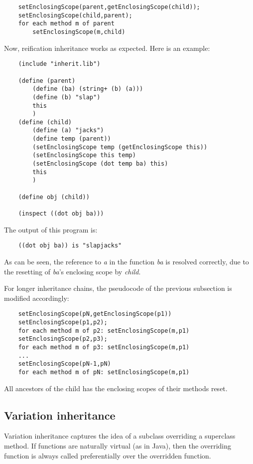 \begin{verbatim}
    setEnclosingScope(parent,getEnclosingScope(child));
    setEnclosingScope(child,parent);
    for each method m of parent
        setEnclosingScope(m,child)
\end{verbatim}

Now, reification inheritance works as expected. Here is an example:

\begin{verbatim}
    (include "inherit.lib")

    (define (parent)
        (define (ba) (string+ (b) (a)))
        (define (b) "slap")
        this
        )
    (define (child)
        (define (a) "jacks")
        (define temp (parent))
        (setEnclosingScope temp (getEnclosingScope this))
        (setEnclosingScope this temp)
        (setEnclosingScope (dot temp ba) this)
        this
        )

    (define obj (child))

    (inspect ((dot obj ba)))
\end{verbatim}

The output of this program is:

\begin{verbatim}
    ((dot obj ba)) is "slapjacks"
\end{verbatim}

As can be seen, the reference to {\it a} in the function {\it ba} is
resolved correctly, due to the resetting of {\it ba}'s enclosing scope
by {\it child}.

For longer inheritance chains, the pseudocode of the previous subsection
is modified accordingly:

\begin{verbatim}
    setEnclosingScope(pN,getEnclosingScope(p1))
    setEnclosingScope(p1,p2);
    for each method m of p2: setEnclosingScope(m,p1)
    setEnclosingScope(p2,p3);
    for each method m of p3: setEnclosingScope(m,p1)
    ...
    setEnclosingScope(pN-1,pN)
    for each method m of pN: setEnclosingScope(m,p1)
\end{verbatim}

All ancestors of the child has the enclosing scopes of their methods reset.

\subsection{Variation inheritance}

Variation inheritance captures the idea of a subclass overriding a
superclass method. If functions are naturally virtual (as in Java),
then the overriding function is always called preferentially over the
overridden function.

